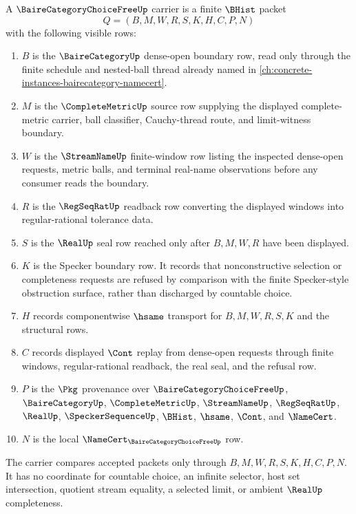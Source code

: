 \begin{definition}
\label{def:baire-category-choice-free-carrier}
A $\BaireCategoryChoiceFreeUp$ carrier is a finite $\BHist$ packet
$$
Q=(B,M,W,R,S,K,H,C,P,N)
$$
with the following visible rows:
\begin{enumerate}
\item $B$ is the $\BaireCategoryUp$ dense-open boundary row, read only through the finite schedule and nested-ball thread already named in \autoref{ch:concrete-instances-bairecategory-namecert}.
\item $M$ is the $\CompleteMetricUp$ source row supplying the displayed complete-metric carrier, ball classifier, Cauchy-thread route, and limit-witness boundary.
\item $W$ is the $\StreamNameUp$ finite-window row listing the inspected dense-open requests, metric balls, and terminal real-name observations before any consumer reads the boundary.
\item $R$ is the $\RegSeqRatUp$ readback row converting the displayed windows into regular-rational tolerance data.
\item $S$ is the $\RealUp$ seal row reached only after $B,M,W,R$ have been displayed.
\item $K$ is the Specker boundary row. It records that nonconstructive selection or completeness requests are refused by comparison with the finite Specker-style obstruction surface, rather than discharged by countable choice.
\item $H$ records componentwise $\hsame$ transport for $B,M,W,R,S,K$ and the structural rows.
\item $C$ records displayed $\Cont$ replay from dense-open requests through finite windows, regular-rational readback, the real seal, and the refusal row.
\item $P$ is the $\Pkg$ provenance over $\BaireCategoryChoiceFreeUp$, $\BaireCategoryUp$, $\CompleteMetricUp$, $\StreamNameUp$, $\RegSeqRatUp$, $\RealUp$, $\SpeckerSequenceUp$, $\BHist$, $\hsame$, $\Cont$, and $\NameCert$.
\item $N$ is the local $\NameCert_{\BaireCategoryChoiceFreeUp}$ row.
\end{enumerate}
The carrier compares accepted packets only through $B,M,W,R,S,K,H,C,P,N$. It has no coordinate for countable choice, an infinite selector, host set intersection, quotient stream equality, a selected limit, or ambient $\RealUp$ completeness.
\end{definition}

